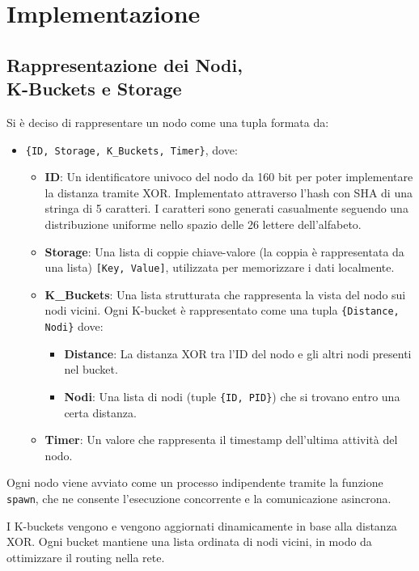 \documentclass{article}
\begin{document}
\section{Implementazione}
\subsection{Rappresentazione dei Nodi,\\ K-Buckets e Storage}
Si è deciso di rappresentare un nodo come una tupla formata da:
\begin{itemize}
    \item \texttt{\{ID, Storage, K\_Buckets, Timer\}}, dove:
    \begin{itemize}
        \item \textbf{ID}: Un identificatore univoco del nodo da 160 bit per poter implementare la distanza tramite XOR. Implementato attraverso l'hash con SHA di una stringa di 5 caratteri. I caratteri sono generati casualmente seguendo una distribuzione uniforme nello spazio delle 26 lettere dell'alfabeto. 
        \item \textbf{Storage}: Una lista di coppie chiave-valore (la coppia è rappresentata da una lista) \texttt{[Key, Value]}, utilizzata per memorizzare i dati localmente.
        \item \textbf{K\_Buckets}: Una lista strutturata che rappresenta la vista del nodo sui nodi vicini. Ogni K-bucket è rappresentato come una tupla \texttt{\{Distance, Nodi\}} dove:
        \begin{itemize}
            \item \textbf{Distance}: La distanza XOR tra l'ID del nodo e gli altri nodi presenti nel bucket.
            \item \textbf{Nodi}: Una lista di nodi (tuple \texttt{\{ID, PID\}}) che si trovano entro una certa distanza.
        \end{itemize}
        \item \textbf{Timer}: Un valore che rappresenta il timestamp dell'ultima attività del nodo.
    \end{itemize}
\end{itemize}

Ogni nodo viene avviato come un processo indipendente tramite la funzione \texttt{spawn}, che ne consente l'esecuzione concorrente e la comunicazione asincrona.

I K-buckets vengono  e vengono aggiornati dinamicamente in base alla distanza XOR. Ogni bucket mantiene una lista ordinata di nodi vicini, in modo da ottimizzare il routing nella rete.
\end{document}
